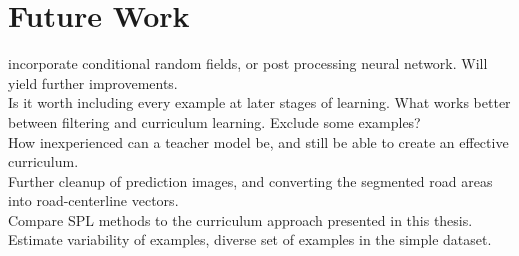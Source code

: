 \section{Future Work}
\label{sec:futureWork}
incorporate conditional random fields, or post processing neural network. Will yield further improvements.\\

Is it worth including every example at later stages of learning. What works better between filtering and curriculum learning. Exclude some examples?\\

How inexperienced can a teacher model be, and still be able to create an effective curriculum.\\

Further cleanup of prediction images, and converting the segmented road areas into road-centerline vectors. \\

Compare SPL methods to the curriculum approach presented in this thesis.\\

Estimate variability of examples, diverse set of examples in the simple dataset.\\



